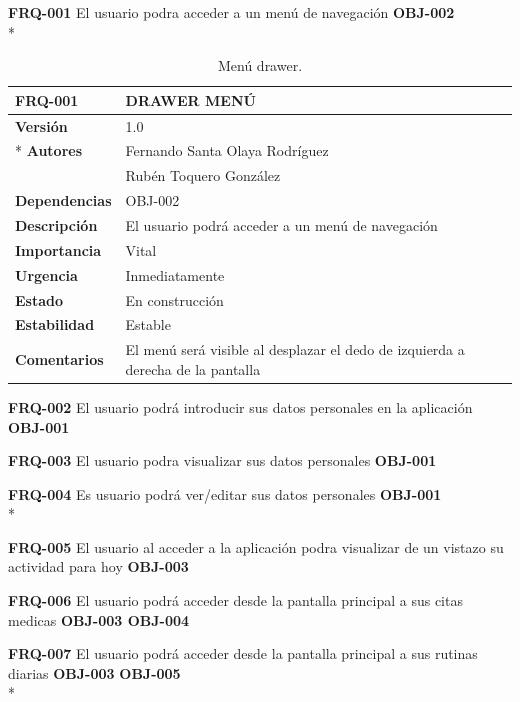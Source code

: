 \documentclass[../pfc.tex]{subfiles}
\begin{document}
	
	\textbf{FRQ-001}	El usuario podra acceder a un menú de navegación	\textbf{OBJ-002}\\*

	\begin{table}[H]
		\centering
		\begin{tabular}[t]{|l|l|}
			\hline \textbf{FRQ-001} & \textbf{DRAWER MENÚ} \\*
			\hline\hline \textbf{Versión} & 1.0 \\ *
			\hline\textbf{Autores} 	& Fernando Santa Olaya Rodríguez\\*
			& Rubén Toquero González\\*
			\hline \textbf{Dependencias} & OBJ-002\\* 			
			\hline \textbf{Descripción} & El usuario podrá acceder a un menú de navegación \\* 
			\hline \textbf{Importancia} & Vital \\* 
			\hline \textbf{Urgencia} & Inmediatamente \\* 
			\hline \textbf{Estado} & En construcción \\* 
			\hline \textbf{Estabilidad} & Estable \\* 
			\hline \textbf{Comentarios} & El menú será visible al desplazar el dedo de izquierda a derecha de la pantalla \\* 
			\hline 
		\end{tabular}
		\caption{Menú drawer.}
		\label{tabla:req001}
	\end{table}
	
	
	\textbf{FRQ-002}	El usuario podrá introducir sus datos personales en la aplicación 	\textbf{OBJ-001}
	
	\textbf{FRQ-003}	El usuario podra visualizar sus datos personales	\textbf{OBJ-001}
	
	\textbf{FRQ-004}	Es usuario podrá ver/editar sus datos personales	\textbf{OBJ-001}\\*
	
	
	
	\textbf{FRQ-005}	El usuario al acceder a la aplicación podra visualizar de un vistazo su actividad para hoy 		\textbf{OBJ-003}
	
	\textbf{FRQ-006}	El usuario podrá acceder desde la pantalla principal a sus citas medicas	\textbf{OBJ-003 OBJ-004}
	
	\textbf{FRQ-007}	El usuario podrá acceder desde la pantalla principal a sus rutinas diarias	\textbf{OBJ-003}  \textbf{OBJ-005}\\*					
	
\end{document}
